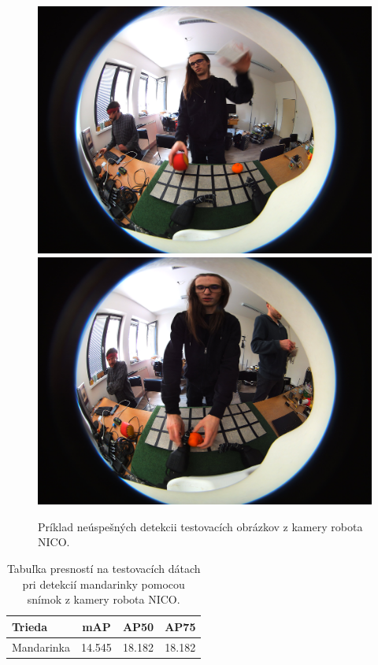 \begin{figure}[H]
\includegraphics[width=\textwidth]{images/2023-04-17-140935_8.jpg}
\includegraphics[width=\textwidth]{images/2023-04-17-140334_38.jpg}
\centering
\caption{Príklad neúspešných detekcii testovacích obrázkov z kamery robota NICO.}
\label{fig:image702}
\end{figure}

\begin{table}[H]
\begin{tabular}{|l|c|c|c|}
\hline
\textbf{Trieda} & \textbf{mAP} & \textbf{AP50} & \textbf{AP75} \\
\hline
Mandarinka & 14.545 & 18.182 & 18.182 \\
\hline
\end{tabular}
\centering
\caption{Tabuľka presností na testovacích dátach pri detekcií mandarinky pomocou snímok z kamery robota NICO.}
\label{tab:table700}
\end{table}

